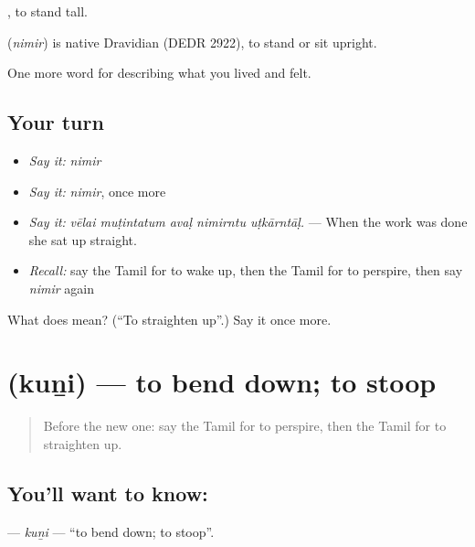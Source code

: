  , to stand tall.

\begin{cousinweb}
\textbf{} (\emph{nimir}) is native Dravidian (DEDR 2922), to stand or sit upright.
\end{cousinweb}

\begin{grammarlens}[title={What you've built}]
One more word for describing what you lived and felt.
\end{grammarlens}

\subsection*{Your turn}
\begin{itemize}
\raggedright
  \item \emph{Say it:} \emph{nimir}
  \item \emph{Say it:} \emph{nimir}, once more
  \item \emph{Say it:} \emph{vēlai muṭintatum avaḷ nimirntu uṭkārntāḷ.} — When the work was done she sat up straight.
  \item \emph{Recall:} say the Tamil for to wake up, then the Tamil for to perspire, then say \emph{nimir} again
\end{itemize}

\begin{tcolorbox}[breakable,colback=teal!4,colframe=teal!35!black,title={Before you move on}]
What does  mean? (\textquotedblleft{}To straighten up\textquotedblright{}.) Say it once more.
\end{tcolorbox}
\section[\texorpdfstring{\ta{குனி} (kuṉi)}{குனி (kuṉi)}]{ (kuṉi) — to bend down; to stoop}

\label{lesson:TA-C490-kuni}



\begin{quote}
Before the new one: say the Tamil for to perspire, then the Tamil for to straighten up.
\end{quote}

\subsection*{You'll want to know: }
\textbf{} — \emph{kuṉi} — \textquotedblleft{}to bend down; to stoop\textquotedblright{}.

